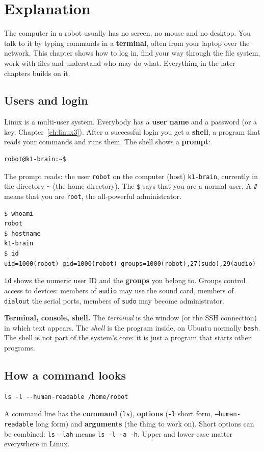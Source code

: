 \label{ch:linux1}

\section*{Explanation}
The computer in a robot usually has no screen, no mouse and no desktop. You talk to it by typing commands in a \textbf{terminal}, often from your laptop over the network. This chapter shows how to log in, find your way through the file system, work with files and understand who may do what. Everything in the later chapters builds on it.

\subsection*{Users and login}
Linux is a multi-user system. Everybody has a \textbf{user name} and a password (or a key, Chapter~\ref{ch:linux3}). After a successful login you get a \textbf{shell}, a program that reads your commands and runs them. The shell shows a \textbf{prompt}:
\begin{verbatim}
robot@k1-brain:~$
\end{verbatim}
The prompt reads: the user \texttt{robot} on the computer (host) \texttt{k1-brain}, currently in the directory \texttt{\textasciitilde} (the home directory). The \texttt{\$} says that you are a normal user. A \texttt{\#} means that you are \texttt{root}, the all-powerful administrator.

\begin{verbatim}
$ whoami
robot
$ hostname
k1-brain
$ id
uid=1000(robot) gid=1000(robot) groups=1000(robot),27(sudo),29(audio)
\end{verbatim}
\texttt{id} shows the numeric user ID and the \textbf{groups} you belong to. Groups control access to devices: members of \texttt{audio} may use the sound card, members of \texttt{dialout} the serial ports, members of \texttt{sudo} may become administrator.

\textbf{Terminal, console, shell.} The \emph{terminal} is the window (or the SSH connection) in which text appears. The \emph{shell} is the program inside, on Ubuntu normally \texttt{bash}. The shell is not part of the system's core: it is just a program that starts other programs.

\subsection*{How a command looks}
\begin{verbatim}
ls -l --human-readable /home/robot
\end{verbatim}
A command line has the \textbf{command} (\texttt{ls}), \textbf{options} (\texttt{-l} short form, \texttt{--human-readable} long form) and \textbf{arguments} (the thing to work on). Short options can be combined: \texttt{ls -lah} means \texttt{ls -l -a -h}. Upper and lower case matter everywhere in Linux.

